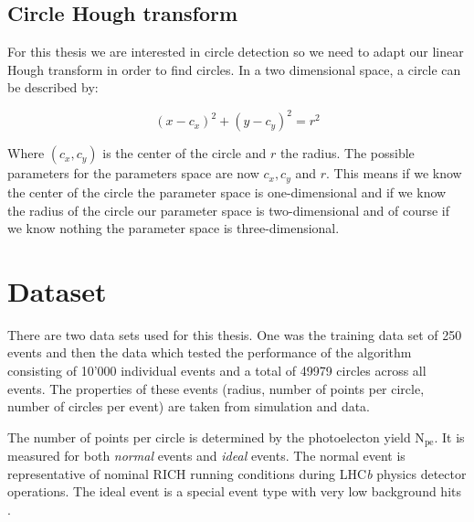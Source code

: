 \documentclass[11pt,twoside]{scrreprt}
\begin{document}
\subsection{Circle Hough transform} %
\label{sub:circle_hough_transform}

For this thesis we are interested in circle detection so we need to adapt our linear Hough transform in order to find circles. In a two dimensional space, a circle can be described by:

\begin{equation}
		(x-c_x)^2 + (y-c_y)^2 = r^2
\end{equation}

Where $(c_x,c_y)$ is the center of the circle and $r$ the radius. The possible parameters for the parameters space are now $c_x, c_y$ and $r$. This means if we know the center of the circle the parameter space is one-dimensional and if we know the radius of the circle our parameter space is two-dimensional and of course if we know nothing the parameter space is three-dimensional.




\section{Dataset} %
\label{sec:dataset}
There are two data sets used for this thesis. One was the training data set of 250 events and then the data which tested the performance of the algorithm consisting of 10'000
individual events and a total of 49979 circles across all events. The properties of these events (radius, number of points per circle, number of circles per event) are taken from simulation and data.

The number of points per circle is determined by the photoelecton yield N$_\text{pe}$. It is measured for both \emph{normal} events and \emph{ideal}
events. The normal event is representative of nominal RICH running conditions during LHC\textit{b} physics detector operations. The ideal event is
a special event type with very low background hits \cite{RICHPerf2012}.
\end{document}
